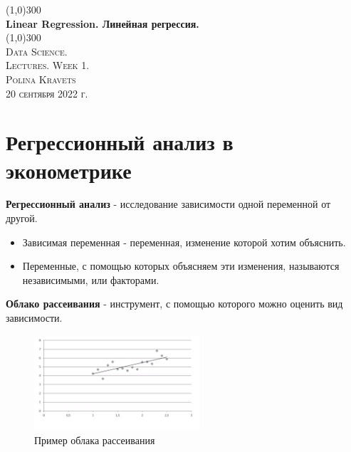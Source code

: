 \documentclass{article}
\begin{document}
\begin{titlepage}
    \begin{center}
        \line(1,0){300}\\
        [0,25in]
        \huge{\bfseries Linear Regression. Линейная регрессия.}\\
        [2mm]
         \line(1,0){300}\\
         \textsc{\Large Data Science.}\\
         \textsc{\Large Lectures. Week 1.}\\
         [4mm]
          \textsc{\small Polina Kravets \\
          20 сентября 2022 г.\\}
    \end{center}

\tableofcontents
\end{titlepage}



\section{Регрессионный анализ в эконометрике}\label{sec:intro}
\textbf{Регрессионный анализ} - исследование зависимости одной переменной от другой.
\begin{itemize}
    \item Зависимая переменная - переменная, изменение которой хотим объяснить. 
    \item Переменные, с помощью которых объясняем эти изменения, называются независимыми, или факторами.
\end{itemize}
\textbf{Облако рассеивания} - инструмент, с помощью которого можно оценить вид зависимости.\\

\begin{figure}
    \centering
    \includegraphics[width=0.55\textwidth]{graph1.png}
    \caption[Optional caption]{Пример облака рассеивания}
    \label{fig:example_chart}
\end{figure}
\end{document}
